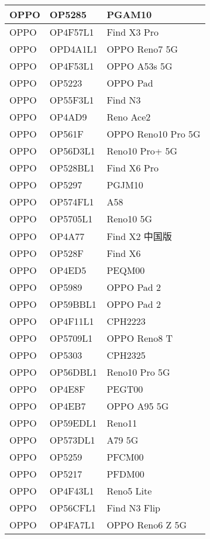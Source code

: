 \begin{tabularx}{\linewidth}{|l|X|X|}
        OPPO & OP5285 & PGAM10 \\ \hline
        OPPO & OP4F57L1 & Find X3 Pro \\ \hline
        OPPO & OPD4A1L1 & OPPO Reno7 5G \\ \hline
        OPPO & OP4F53L1 & OPPO A53s 5G \\ \hline
        OPPO & OP5223 & OPPO Pad \\ \hline
        OPPO & OP55F3L1 & Find N3 \\ \hline
        OPPO & OP4AD9 & Reno Ace2 \\ \hline
        OPPO & OP561F & OPPO Reno10 Pro 5G \\ \hline
        OPPO & OP56D3L1 & Reno10 Pro+ 5G \\ \hline
        OPPO & OP528BL1 & Find X6 Pro \\ \hline
        OPPO & OP5297 & PGJM10 \\ \hline
        OPPO & OP574FL1 & A58 \\ \hline
        OPPO & OP5705L1 & Reno10 5G \\ \hline
        OPPO & OP4A77 & Find X2 中国版 \\ \hline
        OPPO & OP528F & Find X6 \\ \hline
        OPPO & OP4ED5 & PEQM00 \\ \hline
        OPPO & OP5989 & OPPO Pad 2 \\ \hline
        OPPO & OP59BBL1 & OPPO Pad 2 \\ \hline
        OPPO & OP4F11L1 & CPH2223 \\ \hline
        OPPO & OP5709L1 & OPPO Reno8 T \\ \hline
        OPPO & OP5303 & CPH2325 \\ \hline
        OPPO & OP56DBL1 & Reno10 Pro 5G \\ \hline
        OPPO & OP4E8F & PEGT00 \\ \hline
        OPPO & OP4EB7 & OPPO A95 5G \\ \hline
        OPPO & OP59EDL1 & Reno11 \\ \hline
        OPPO & OP573DL1 & A79 5G \\ \hline
        OPPO & OP5259 & PFCM00 \\ \hline
        OPPO & OP5217 & PFDM00 \\ \hline
        OPPO & OP4F43L1 & Reno5 Lite \\ \hline
        OPPO & OP56CFL1 & Find N3 Flip \\ \hline
        OPPO & OP4FA7L1 & OPPO Reno6 Z 5G \\ \hline

\end{tabularx}

